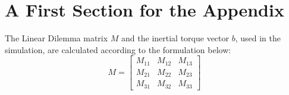\section{A First Section for the Appendix}

The Linear Dilemma matrix $M$ and the inertial torque vector $b$, used in the simulation, are calculated according to the formulation below:
\begin{equation}
M=\left[ \begin{array}{ccc}
M_{11} & M_{12} & M_{13} \\
M_{21} & M_{22} & M_{23} \\
M_{31} & M_{32} & M_{33}
\end{array} \right]
\end{equation}

